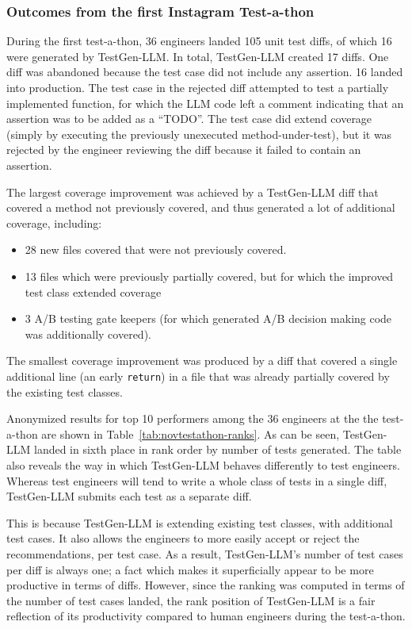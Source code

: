 \documentclass[sigconf,screen]{acmart}
\begin{document}
\subsubsection{Outcomes from the first Instagram Test-a-thon}
\label{sec:cheeky-todo}
During the first test-a-thon, 36 engineers landed 105 unit test diffs, of which 16 were generated by TestGen-LLM.
In total, TestGen-LLM created 17 diffs.
One diff was abandoned because the test case did not include any assertion.
16 landed into production.
The test case in the rejected diff attempted to test a partially implemented function, for which the LLM code left a comment indicating that an assertion was to be added as a “TODO”.
The test case did extend coverage (simply by executing the previously unexecuted method-under-test), but it was rejected by the engineer reviewing the diff because it failed to contain an assertion.

The largest coverage improvement was achieved by a TestGen-LLM diff that covered a method not previously covered, and thus generated a lot of additional coverage, including:
\begin{itemize}
\item 28 new files covered that were not previously covered.
\item 13 files which were previously partially covered, but for which the improved test class extended coverage
\item 3 A/B testing gate keepers (for which generated A/B decision making code was additionally covered).
\end{itemize}

The smallest coverage improvement was produced by a diff that covered a single additional line (an early {\tt return}) in a file that was already partially covered by the existing test classes.


Anonymized results for top 10 performers among the 36 engineers at the the test-a-thon are shown in Table~\ref{tab:novtestathon-ranks}.
As can be seen, TestGen-LLM landed in sixth place in rank order by number of tests generated.
The table also reveals the way in which TestGen-LLM behaves differently to test engineers.
Whereas  test engineers will tend to write a whole class of tests in a single diff, 
TestGen-LLM submits each test as a separate diff.

This is because TestGen-LLM is extending existing test classes, with additional test cases.
It also allows the engineers to more easily accept or reject the recommendations, per test case.
As a result, TestGen-LLM's number of test cases per diff is always one; a fact which  makes it superficially appear to be more productive in terms of diffs.
However, since the ranking was computed in terms of the number of test cases landed, the rank position of TestGen-LLM 
is a fair reflection of its productivity compared to human engineers during the test-a-thon.
\end{document}
